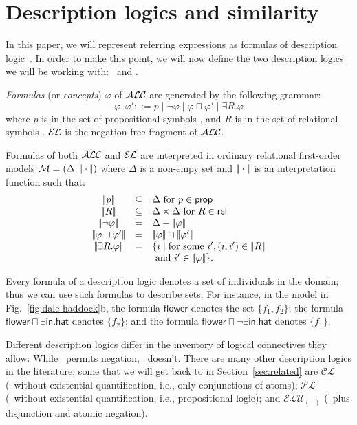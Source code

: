\section{Description logics and similarity}
\label{sec:bisim}

In this paper, we will represent referring expressions as formulas of
description logic~\cite{baad:desc03}.  In order to make this point, we
will now define the two description logics we will be working with:
\alc\ and \el.

\emph{Formulas} (or \emph{concepts}) $\varphi$ of $\mathcal{ALC}$ are generated
by the following grammar:
$$
\varphi,\varphi' ::= p \mid \neg \varphi \mid \varphi \sqcap \varphi'
\mid \exists R. \varphi
$$
where $p$ is in the set of propositional symbols \prop, and $R$ is in
the set of relational symbols \rel. $\mathcal{EL}$ is the negation-free
fragment of $\mathcal{ALC}$.

Formulas of both $\mathcal{ALC}$ and $\mathcal{EL}$ are interpreted in ordinary
relational first-order models $\mathcal{M} = (\Delta,|\!|\cdot|\!|)$ where
$\Delta$ is a non-empy set and $|\!|\cdot|\!|$ is an
interpretation function such that:
$$
\begin{array}{ccl}
\interp{p} & \subseteq & \Delta  \mbox{ for $p \in \prop$}\\
\interp{R} & \subseteq & \Delta \times \Delta  \mbox{ for $R \in \rel$}\\
\interp{\neg \varphi} & = & \Delta - \interp{\varphi}\\
\interp{\varphi \sqcap \varphi'} & = & \interp{\varphi} \cap \interp{\varphi'}\\
\interp{\exists R.\varphi} & = & \{i \mid \mbox{for some } i', (i,i') \in \interp{R}\\
& & \mbox{ and } i' \in \interp{\varphi} \}.\\
\end{array}
$$


Every formula of a description logic denotes a set of individuals in
the domain; thus we can use such formulas to describe sets.  For
instance, in the model in Fig.~\ref{fig:dale-haddock}b, the formula
$\mathsf{flower}$ denotes the set $\{f_1,f_2\}$; the formula
$\mathsf{flower} \sqcap \exists \mathsf{in}.\mathsf{hat}$ denotes
$\{f_2\}$; and the formula $\mathsf{flower} \sqcap \neg
\exists \mathsf{in}.\mathsf{hat}$ denotes $\{f_1\}$.

Different description logics differ in the inventory of logical
connectives they allow: While \alc\ permits negation, \el\
doesn't. There are many other description logics in the literature;
some that we will get back to in Section~\ref{sec:related} are
$\mathcal{CL}$ (\el\ without existential quantification, i.e., only
conjunctions of atoms); $\mathcal{PL}$ (\alc\ without existential
quantification, i.e., propositional logic); and
$\mathcal{ELU}_{(\neg)}$ (\el\ plus disjunction and atomic negation).

